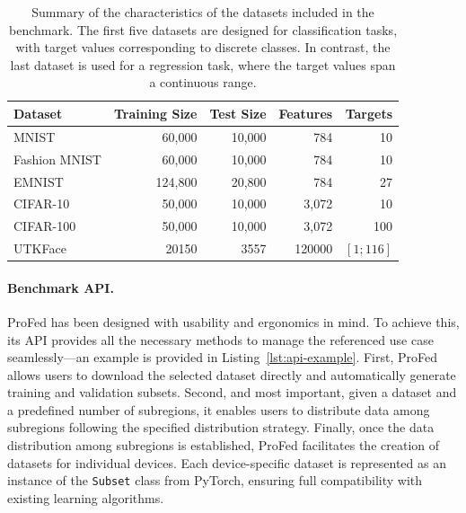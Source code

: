\begin{table}
    \centering
    \caption{
        Summary of the characteristics of the datasets included in the benchmark.
        The first five datasets are designed for classification tasks, 
         with target values corresponding to discrete classes.
        In contrast, the last dataset is used for a regression task, 
        where the target values span a continuous range.
        }
    \label{tab:datasets}
    \begin{tabular}{lrrrr}
    \toprule
    \textbf{Dataset} & \textbf{Training Size} & \textbf{Test Size} & \textbf{Features} & \textbf{Targets} \\ 
    \midrule
    MNIST           & 60,000 & 10,000 & 784  & 10  \\ 
    Fashion MNIST   & 60,000 & 10,000 & 784  & 10 \\ 
    EMNIST  & 124,800 & 20,800 & 784  & 27 \\ 
    CIFAR-10       & 50,000 & 10,000 & 3,072 & 10 \\ 
    CIFAR-100      & 50,000 & 10,000 & 3,072 & 100 \\ 
    UTKFace       & 20150 & 3557 & 120000 & $[1;116]$\\
    \bottomrule
    \end{tabular}
\end{table}

\paragraph{Benchmark API.} 
ProFed has been designed with usability and ergonomics in mind. 
%
To achieve this, its API provides all the necessary methods 
 to manage the referenced use case seamlessly---an example is provided in Listing~\ref{lst:api-example}.
%
First, ProFed allows users to download the selected dataset directly 
 and automatically generate training and validation subsets.
%
Second, and most important, given a dataset and a predefined number of subregions,
 it enables users to distribute data among subregions following the
 specified distribution strategy.
%
Finally, once the data distribution among subregions is established, 
 ProFed facilitates the creation of datasets for individual devices. 
%
Each device-specific dataset is represented as an instance of the \texttt{Subset} class from PyTorch, 
 ensuring full compatibility with existing learning algorithms. %



